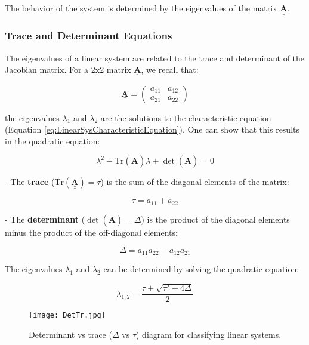 \documentclass{amsbook}
\begin{document}
The behavior of the system is determined by the eigenvalues of the matrix \(\underline{\underline{\mathbf{A}}}\).

\subsubsection{Trace and Determinant Equations}
The eigenvalues of a linear system are related to the trace and determinant of the Jacobian matrix. For a 2x2 matrix \(\underline{\underline{\mathbf{A}}}\), we recall that:

\[
\underline{\underline{\mathbf{A}}} = \begin{pmatrix} a_{11} & a_{12} \\ a_{21} & a_{22} \end{pmatrix}
\]

the eigenvalues \( \lambda_1 \) and \( \lambda_2 \) are the solutions to the characteristic equation (Equation \ref{eq:LinearSysCharacteristicEquation}). One can show that this results in the quadratic equation:

\begin{equation}
    \lambda^2 - \text{Tr}(\underline{\underline{\mathbf{A}}})\lambda + \det(\underline{\underline{\mathbf{A}}}) = 0
\end{equation}

- The \textbf{trace} (\( \text{Tr}(\underline{\underline{\mathbf{A}}}) = \tau \)) is the sum of the diagonal elements of the matrix:

\[
\tau = a_{11} + a_{22}
\]

- The \textbf{determinant} (\( \det(\underline{\underline{\mathbf{A}}}) = \Delta\)) is the product of the diagonal elements minus the product of the off-diagonal elements:

\[
\Delta = a_{11}a_{22} - a_{12}a_{21}
\]

The eigenvalues \( \lambda_1 \) and \( \lambda_2 \) can be determined by solving the quadratic equation:

\begin{equation}
    \lambda_{1,2} = \frac{\tau \pm \sqrt{\tau^2 - 4 \Delta}}{2}
\end{equation}

\begin{figure}[H]
    \centering
    \texttt{[image: DetTr.jpg]}
    \caption{Determinant vs trace ($\Delta$ vs $\tau$) diagram for classifying linear systems.}
    \label{fig:DetTr}
\end{figure}
\end{document}
